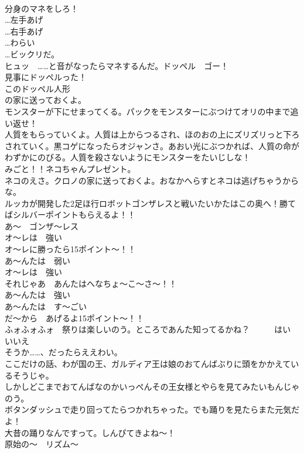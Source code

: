 \documentclass[8pt]{extreport}
\begin{document}
\begin{CJK}{UTF8}{min}
\\	分身のマネをしろ！
\\	…左手あげ　
\\	…右手あげ
\\	…わらい　　
\\	…ビックリだ。	
\\	ヒュッ　……と音がなったらマネするんだ。ドッペル　ゴー！	
\\	見事にドッペルった！	
\\	このドッペル人形
\\	の家に送っておくよ。	
\\	モンスターが下にせまってくる。パックをモンスターにぶつけてオリの中まで追い返せ！	
\\	人質をもらっていくよ。人質は上からつるされ、ほのおの上にズリズリっと下ろされていく。黒コゲになったらオジャンさ。あおい光にぶつかれば、人質の命がわずかにのびる。人質を殺さないようにモンスターをたいじしな！	
\\	みごと！！ネコちゃんプレゼント。	
\\	ネコのえさ。クロノの家に送っておくよ。おなかへらすとネコは逃げちゃうからな。	
\\	ルッカが開発した2足ほ行ロボットゴンザレスと戦いたいかたはこの奥へ！勝てばシルバーポイントもらえるよ！！	
\\	あ～　ゴンザ～レス
\\	オ～レは　強い
\\	オ～レに勝ったら15ポイント～！！
\\	あ～んたは　弱い
\\	オ～レは　強い
\\	それじゃあ　あんたはへなちょ～こ～さ～！！
\\	あ～んたは　強い
\\	あ～んたは　す～ごい
\\	だ～から　あげるよ15ポイント～！！
\\	ふォふォふォ　祭りは楽しいのう。ところであんた知ってるかね？　　　はい　　　いいえ	
\\	そうか……、だったらええわい。	
\\	ここだけの話、わが国の王、ガルディア王は娘のおてんばぶりに頭をかかえているそうじゃ。	
\\	しかしどこまでおてんばなのかいっぺんその王女様とやらを見てみたいもんじゃのう。	
\\	ボタンダッシュで走り回ってたらつかれちゃった。でも踊りを見たらまた元気だよ！	
\\	大昔の踊りなんですって。しんぴてきよね～！	
\\	原始の～　リズム～

\end{CJK}
\end{document}
